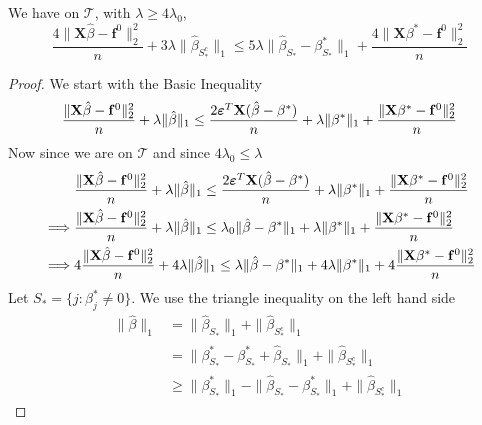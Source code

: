 \begin{lemma}
    We have on $\mathscr{T}$, with $\lambda \geq 4 \lambda_{0}$,
    \begin{equation}
        \frac{4 \|\mathbf{X} \hat{\beta}-\mathbf{f}^0\|_{2}^{2}}{n} + 3 \lambda \| \hat{\beta}_{S^{c}_{*}} \|_{1} \leq 5 \lambda \| \hat{\beta}_{S_{*}} - \beta_{S_{*}}^{*} \|_{1} + \frac{4 \|\mathbf{X} \beta^{*} - \mathbf{f}^{0} \|_{2}^{2}}{n}
    \end{equation}
\end{lemma}
\begin{proof}
    We start with the Basic Inequality
    $$
        \frac{\|\mathbf{X} \hat \beta - \mathbf{f}^0 \|_{2}^{2}}{n} + \lambda\| \hat \beta \|_{1} \leq  \frac{2 \boldsymbol{\varepsilon}^T \mathbf{X} (\hat\beta - \beta^*)}{n} + \lambda \| \beta^*\|_{1} + \frac{\|\mathbf{X} \beta^* - \mathbf{f}^0\|_{2}^{2}}{n}
    $$
    Now since we are on $\mathscr{T}$ and since $4 \lambda_0 \leq \lambda$
    \begin{align*}
                 & \frac{\|\mathbf{X} \hat \beta - \mathbf{f}^0 \|_{2}^{2}}{n} + \lambda\| \hat \beta \|_{1} \leq  \frac{2 \boldsymbol{\varepsilon}^T \mathbf{X} (\hat\beta - \beta^*)}{n} + \lambda \| \beta^*\|_{1} + \frac{\|\mathbf{X} \beta^* - \mathbf{f}^0\|_{2}^{2}}{n} \\
        \implies &
        \frac{\|\mathbf{X} \hat \beta - \mathbf{f}^0 \|_{2}^{2}}{n} + \lambda\| \hat \beta \|_{1} \leq \lambda_0 \| \hat\beta - \beta^* \|_{1} + \lambda \| \beta^*\|_{1} + \frac{\|\mathbf{X} \beta^* - \mathbf{f}^0\|_{2}^{2}}{n}                 \\
        \implies &
        4 \frac{\| \mathbf{X} \hat \beta - \mathbf{f}^0 \|_{2}^{2}}{n} + 4 \lambda\| \hat \beta \|_{1} \leq \lambda \| \hat\beta - \beta^* \|_{1} + 4 \lambda \| \beta^*\|_{1} + 4\frac{\|\mathbf{X} \beta^* - \mathbf{f}^0\|_{2}^{2}}{n}           \\
    \end{align*}
    Let $S_{*} = \{j : \beta_{j}^{*} \neq 0 \}$. We use the triangle inequality on the left hand side
    \begin{align*}
        \|\hat{\beta}\|_{1}
         & = \|\hat{\beta}_{S_{*}} \|_{1} + \|\hat{\beta}_{S_{*}^{c}} \|_{1}                                                  \\
         & = \|\beta_{S_{*}}^{*} - \beta_{S_{*}}^{*} + \hat{\beta}_{S_{*}} \|_{1} + \|\hat{\beta}_{S_{*}^{c}} \|_{1}          \\
         & \geq \|\beta_{S_{*}}^{*} \|_{1} - \|\hat{\beta}_{S_{*}}-\beta_{S_{*}}^{*} \|_{1}+ \|\hat{\beta}_{S_{*}^{c}} \|_{1}
    \end{align*}

\end{proof}

